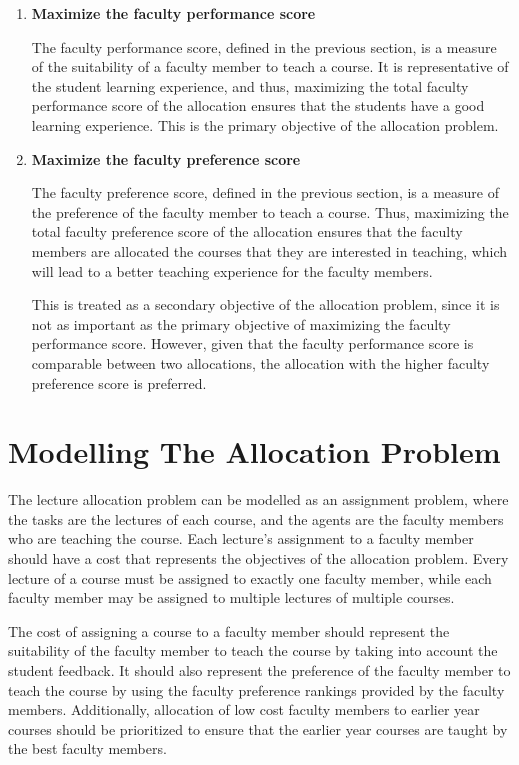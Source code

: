 \begin{enumerate}
  \item \textbf{Maximize the faculty performance score}

        The faculty performance score, defined in the previous section, is a measure of the suitability of a faculty member to teach a course. It is representative of the student learning experience, and thus, maximizing the total faculty performance score of the allocation ensures that the students have a good learning experience. This is the primary objective of the allocation problem.

  \item \textbf{Maximize the faculty preference score}

        The faculty preference score, defined in the previous section, is a measure of the preference of the faculty member to teach a course. Thus, maximizing the total faculty preference score of the allocation ensures that the faculty members are allocated the courses that they are interested in teaching, which will lead to a better teaching experience for the faculty members.

        This is treated as a secondary objective of the allocation problem, since it is not as important as the primary objective of maximizing the faculty performance score. However, given that the faculty performance score is comparable between two allocations, the allocation with the higher faculty preference score is preferred.


\end{enumerate}

\section{Modelling The Allocation Problem}

The lecture allocation problem can be modelled as an assignment problem, where the tasks are the lectures of each course, and the agents are the faculty members who are teaching the course. Each lecture's assignment to a faculty member should have a cost that represents the objectives of the allocation problem. Every lecture of a course must be assigned to exactly one faculty member, while each faculty member may be assigned to multiple lectures of multiple courses.

The cost of assigning a course to a faculty member should represent the suitability of the faculty member to teach the course by taking into account the student feedback. It should also represent the preference of the faculty member to teach the course by using the faculty preference rankings provided by the faculty members. Additionally, allocation of low cost faculty members to earlier year courses should be prioritized to ensure that the earlier year courses are taught by the best faculty members.

